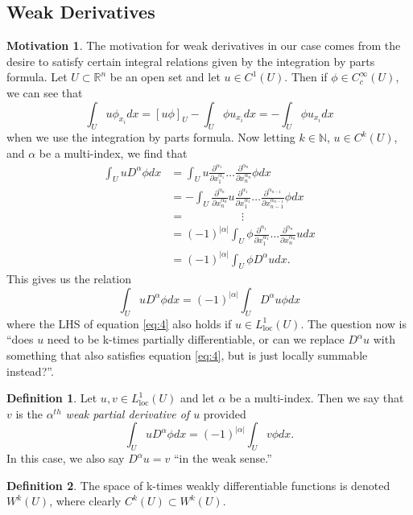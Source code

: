 \documentclass[11pt]{article}
\theoremstyle{definition}
\newtheorem*{definition}{Definition}
\newtheorem*{motivation}{Motivation}
\begin{document}
\subsection{Weak Derivatives}
\begin{motivation}
	The motivation for weak derivatives in our case comes from the desire to satisfy certain integral relations given by the integration by parts formula.
	Let $U \subset \mathbb{R}^n$ be an open set and let $u\in C^1(U)$. Then if $\phi \in C_{c}^{\infty}(U)$, we can see that
	\begin{equation*}
		\int_U u\phi_{x_i}dx = [u\phi]_U - \int_U \phi u_{x_i}dx = - \int_U \phi u_{x_i}dx
	\end{equation*}
	when we use the integration by parts formula. Now letting $k\in \mathbb{N}$, $u \in C^k(U)$, and $\alpha$ be a multi-index, we find that
	\begin{equation*}
		\begin{aligned}
			\int_U u D^{\alpha}\phi dx &= \int_U u \frac{\partial^{\alpha_1}}{\partial x_1^{\alpha_1}}\dots\frac{\partial^{\alpha_n}}{\partial x_n^{\alpha_n}}\phi dx \\
						   &= - \int_U \frac{\partial^{\alpha_n}}{\partial x_n^{\alpha_n}}u \frac{\partial^{\alpha_1}}{\partial x_1^{\alpha_1}}\dots\frac{\partial^{\alpha_{n-1}}}{\partial x_{n-1}^{\alpha_{n-1}}}\phi dx \\
						   &= \quad\qquad\qquad\vdots \\ 
						   &= (-1)^{|\alpha|}\int_U \phi\frac{\partial^{\alpha_1}}{\partial x_1^{\alpha_1}}\dots\frac{\partial^{\alpha_n}}{\partial x_n^{\alpha_n}}u dx \\
						   &= (-1)^{|\alpha|}\int_U \phi D^{\alpha}u dx.
		\end{aligned}
	\end{equation*}
	This gives us the relation
	\begin{equation}
		\label{eq:4}
		\int_U u D^{\alpha}\phi dx = (-1)^{|\alpha|}\int_U D^{\alpha}u\phi  dx
	\end{equation}
	where the LHS of equation \ref{eq:4} also holds if $u\in L_{\text{loc}}^1(U)$.
	The question now is ``does $u$ need to be k-times partially differentiable, or can we replace $D^{\alpha}u$ with something that also satisfies
	equation \ref{eq:4}, but is just locally summable instead?''.
\end{motivation}
\begin{definition}
	Let $u,v \in L_{\text{loc}}^1(U)$ and let $\alpha$ be a multi-index. Then we say that $v$ is the 
	\textit{$\alpha^{th}$ weak partial derivative of $u$} provided
	\begin{equation*}
		\int_U u D^{\alpha}\phi dx = (-1)^{|\alpha|}\int_U v \phi dx.
	\end{equation*}
	In this case, we also say $D^{\alpha}u = v$ ``in the weak sense.''
\end{definition}
\begin{definition}
	The space of k-times weakly differentiable functions is denoted $W^k(U)$, where clearly $C^k(U) \subset W^k(U)$.
\end{definition}
\end{document}
